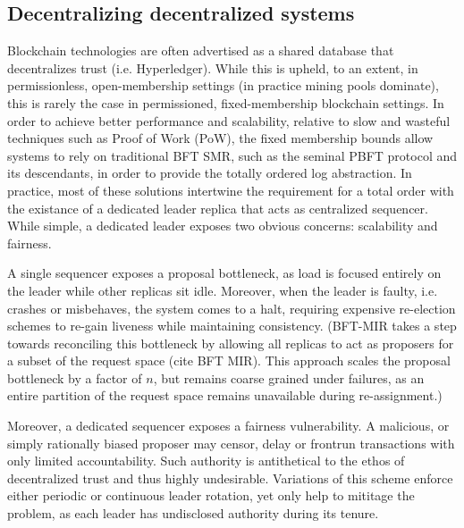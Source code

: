 \subsection{Decentralizing decentralized systems}
Blockchain technologies are often advertised as a shared database that decentralizes trust (i.e. Hyperledger). While this is upheld, to an extent, in permissionless, open-membership settings (in practice mining pools dominate), this is rarely the case in permissioned, fixed-membership blockchain settings. In order to achieve better performance and scalability, relative to slow and wasteful techniques such as Proof of Work (PoW), the fixed membership bounds allow systems to rely on traditional BFT SMR, such as the seminal PBFT protocol and its descendants, in order to provide the totally ordered log abstraction.
In practice, most of these solutions intertwine the requirement for a total order with the existance of a dedicated leader replica that acts as centralized sequencer. While simple,  a dedicated leader exposes two obvious concerns: scalability and fairness.

A single sequencer exposes a proposal bottleneck, as load is focused entirely on the leader while other replicas sit idle. Moreover, when the leader is faulty, i.e. crashes or misbehaves, the system comes to a halt, requiring expensive re-election schemes to re-gain liveness while maintaining consistency.  (BFT-MIR takes a step towards reconciling this bottleneck by allowing all replicas to act as proposers for a subset of the request space (cite BFT MIR). This approach scales the proposal bottleneck by a factor of $n$, but remains coarse grained under failures, as an entire partition of the request space remains unavailable during re-assignment.)

Moreover, a dedicated sequencer exposes a fairness vulnerability. A malicious, or simply rationally biased proposer may censor, delay or frontrun transactions with only limited accountability. Such authority is antithetical to the ethos of decentralized trust and thus highly undesirable. Variations of this scheme enforce either periodic or continuous leader rotation, yet only help to mititage the problem, as each leader has undisclosed authority during its tenure.   

